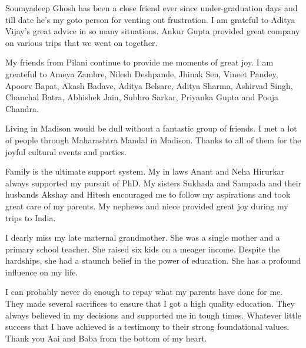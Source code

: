 Soumyadeep Ghosh has been a close friend ever since under-graduation days and till date he's my goto person for venting out frustration. 
I am grateful to Aditya Vijay's great advice in so many situations.
Ankur Gupta provided great company on various trips that we went on together.

My friends from Pilani continue to provide me moments of great joy.
I am greateful to Ameya Zambre, Nilesh Deshpande, Jhinak Sen, Vineet Pandey, Apoorv Bapat, Akash Badave, Aditya Belsare, Aditya Sharma, Ashirvad Singh, Chanchal Batra, Abhishek Jain, Subhro Sarkar, Priyanka Gupta and Pooja Chandra.


Living in Madison would be dull without a fantastic group of friends.
I met a lot of people through Maharashtra Mandal in Madison.
Thanks to all of them for the joyful cultural events and parties.

Family is the ultimate support system. 
My in laws Anant and Neha Hirurkar always supported my pursuit of PhD. 
My sisters Sukhada and Sampada and their husbands Akshay and Hitesh encouraged me to follow my aspirations and took great care of my parents.
My nephews and niece provided great joy during my trips to India.

I dearly miss my late maternal grandmother. 
She was a single mother and a primary school teacher.
She raised six kids on a meager income.
Despite the hardships, she had a staunch belief in the power of education.
She has a profound influence on my life.

I can probably never do enough to repay what my parents have done for me. 
They made several sacrifices to ensure that I got a high quality education. 
They always believed in my decisions and supported me in tough times.
Whatever little success that I have achieved is a testimony to their strong foundational values.
Thank you Aai and Baba from the bottom of my heart.

